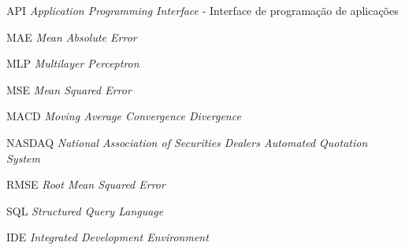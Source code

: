 \begin{siglas}
	\item[API] \textit{Application Programming Interface} - Interface de programação de aplicações
	\item[MAE] \textit{Mean Absolute Error}
	\item[MLP] \textit{Multilayer Perceptron}
	\item[MSE] \textit{Mean Squared Error}
	\item[MACD] \textit{Moving Average Convergence Divergence}
	\item[NASDAQ] \textit{National Association of Securities Dealers Automated Quotation System}
	\item[RMSE] \textit{Root Mean Squared Error}
	\item[SQL] \textit{Structured Query Language}
	\item[IDE] \textit{Integrated Development Environment}
\end{siglas}

